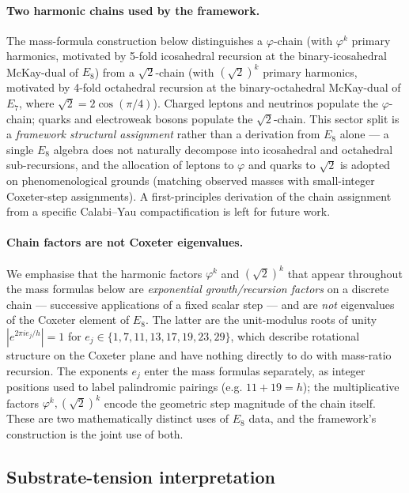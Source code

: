 ﻿\documentclass[reprint,amsmath,amssymb,aps,prd,longbibliography,floatfix]{revtex4-2}
\begin{document}
\paragraph{Two harmonic chains used by the framework.}
The mass-formula construction below distinguishes a $\varphi$-chain
(with $\varphi^k$ primary harmonics, motivated by 5-fold icosahedral
recursion at the binary-icosahedral McKay-dual of $E_8$) from a
$\sqrt{2}$-chain (with $(\sqrt{2})^k$ primary harmonics, motivated
by 4-fold octahedral recursion at the binary-octahedral McKay-dual
of $E_7$, where $\sqrt{2} = 2\cos(\pi/4)$). Charged leptons and
neutrinos populate the $\varphi$-chain; quarks and electroweak
bosons populate the $\sqrt{2}$-chain. This sector split is a
\emph{framework structural assignment} rather than a derivation
from $E_8$ alone --- a single $E_8$ algebra does not naturally
decompose into icosahedral and octahedral sub-recursions, and the
allocation of leptons to $\varphi$ and quarks to $\sqrt{2}$ is
adopted on phenomenological grounds (matching observed masses with
small-integer Coxeter-step assignments). A first-principles
derivation of the chain assignment from a specific Calabi--Yau
compactification is left for future work.

\paragraph{Chain factors are not Coxeter eigenvalues.} We emphasise
that the harmonic factors $\varphi^k$ and $(\sqrt{2})^k$ that appear
throughout the mass formulas below are \emph{exponential
growth/recursion factors} on a discrete chain --- successive
applications of a fixed scalar step --- and are \emph{not} eigenvalues
of the Coxeter element of $E_8$. The latter are the unit-modulus
roots of unity $|e^{2\pi i e_j/h}| = 1$ for $e_j \in \{1, 7, 11, 13,
17, 19, 23, 29\}$, which describe rotational structure on the Coxeter
plane and have nothing directly to do with mass-ratio recursion. The
exponents $e_j$ enter the mass formulas separately, as integer
positions used to label palindromic pairings (e.g. $11 + 19 = h$);
the multiplicative factors $\varphi^k, (\sqrt{2})^k$ encode the
geometric step magnitude of the chain itself. These are two
mathematically distinct uses of $E_8$ data, and the framework's
construction is the joint use of both.

\subsection{Substrate-tension interpretation}
\end{document}
